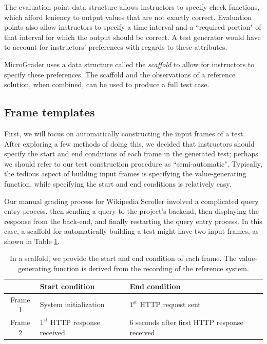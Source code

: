 \documentclass[12pt]{article}
\begin{document}
The evaluation point data structure allows instructors to specify check functions, which afford leniency to output values that are not exactly correct.  Evaluation points also allow instructors to specify a time interval and a ``required portion" of that interval for which the output should be correct.  A test generator would have to account for instructors' preferences with regards to these attributes.

MicroGrader uses a data structure called the \textit{scaffold} to allow for instructors to specify these preferences.  The scaffold and the observations of a reference solution, when combined, can be used to produce a full test case.

\subsection{Frame templates}
First, we will focus on automatically constructing the input frames of a test.  After exploring a few methods of doing this, we decided that instructors should specify the start and end conditions of each frame in the generated test; perhaps we should refer to our test construction procedure as ``semi-automatic".  Typically, the tedious aspect of building input frames is specifying the value-generating function, while specifying the start and end conditions is relatively easy.

Our manual grading process for Wikipedia Scroller involved a complicated query entry process, then sending a query to the project's backend, then displaying the response from the back-end, and finally restarting the query entry process.  In this case, a scaffold for automatically building a test might have two input frames, as shown in Table \ref{table:frame-templates}.

\begin{table}[ht]
\begin{center}
\vspace{2mm}
\begin{tabular}{c|ll}
& Start condition & End condition \\ \hline
Frame 1 & System initialization & $1^{\text{st}}$ HTTP request sent \\
Frame 2 & $1^{\text{st}}$ HTTP response received & 6 seconds after first HTTP response received \\ \hline
\end{tabular}
\caption{In a scaffold, we provide the start and end condition of each frame.  The value-generating function is derived from the recording of the reference system.}
\label{table:frame-templates}
\end{center}
\end{table}
\end{document}
